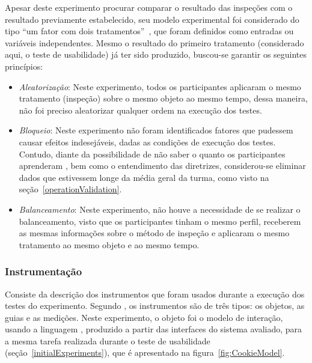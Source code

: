 Apesar deste  experimento procurar comparar o  resultado das inspeções
com o resultado previamente  estabelecido, seu modelo experimental foi
considerado      do      tipo       ``um      fator      com      dois
tratamentos''~\cite[p.~54]{Wohlin:etal:2000}, que foram definidos como
entradas  ou variáveis  independentes. Mesmo  o resultado  do primeiro
tratamento  (considerado aqui,  o teste  de usabilidade)  já  ter sido
produzido, buscou-se garantir os seguintes princípios:

\begin{itemize}

  \item {\em Aleatorização}: Neste experimento, todos os participantes
    aplicaram o  mesmo tratamento (inspeção)  sobre o mesmo  objeto ao
    mesmo tempo,  dessa maneira, não foi  preciso aleatorizar qualquer
    ordem na execução dos testes.

  \item  {\em  Bloqueio}: Neste  experimento  não foram  identificados
    fatores  que  pudessem   causar  efeitos  indesejáveis,  dadas  as
    condições de execução dos testes. Contudo, diante da possibilidade
    de  não saber o  quanto os  participantes aprenderam  \aladim, bem
    como o  entendimento das diretrizes,  considerou-se eliminar dados
    que  estivessem longe  da  média  geral da  turma,  como visto  na
    seção~\ref{operationValidation}.

  \item   {\em  Balanceamento}:   Neste  experimento,   não   houve  a
    necessidade  de   se  realizar  o  balanceamento,   visto  que  os
    participantes   tinham  o  mesmo   perfil,  receberem   as  mesmas
    informações  sobre  o  método  de  inspeção e  aplicaram  o  mesmo
    tratamento ao mesmo objeto e ao mesmo tempo.

\end{itemize}

\subsubsection{Instrumentação}
\label{experimentInstrumentation}

Consiste  da descrição  dos instrumentos  que foram  usados  durante a
execução      dos       testes      do      experimento.       Segundo
, os  instrumentos são de  três tipos: os
objetos, as  guias e as medições.   Neste experimento, o  objeto foi o
modelo de  interação, usando a  linguagem \aladim, produzido  a partir
das  interfaces do  sistema avaliado,  para a  mesma  tarefa realizada
durante o teste de usabilidade (seção~\ref{initialExperiments}), que é
apresentado na figura~\ref{fig:CookieModel}.

